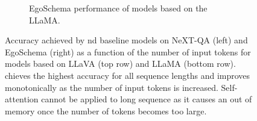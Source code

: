 \begin{figure}[t]
\begin{subfigure}[b]{0.45\textwidth}
    \caption{EgoSchema performance of models based on the LLaMA.}
\end{subfigure}
\vspace{-3mm}
\caption{\small{Accuracy achieved by nd baseline models on NeXT-QA (left) and EgoSchema (right) as a function of the number of input tokens for models based on LLaVA (top row) and LLaMA (bottom row).  chieves the highest accuracy for all sequence lengths and improves monotonically as the number of input tokens is increased. Self-attention cannot be applied to long sequence as it causes an out of memory once the number of tokens becomes too large.}}
\vspace{-5mm}
\label{fig:performance}
\end{figure}





